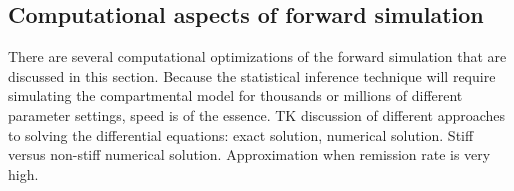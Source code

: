 \subsection{Computational aspects of forward simulation}
There are several computational optimizations of the forward
simulation that are discussed in this section.  Because the
statistical inference technique will require simulating the
compartmental model for thousands or millions of different parameter
settings, speed is of the essence.  TK discussion of different
approaches to solving the differential equations: exact solution,
numerical solution. Stiff versus non-stiff numerical
solution. Approximation when remission rate is very high.
